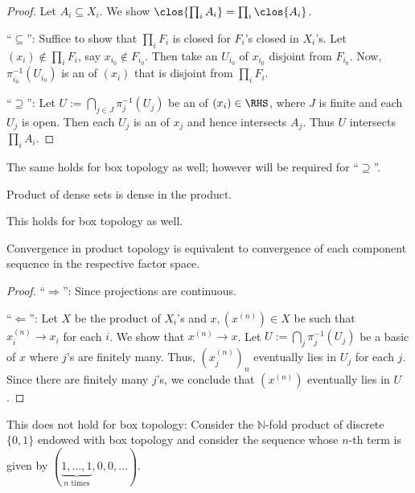 	\begin{proof}
		Let $A_i\subseteq X_i$. We show $\clos{\prod_i A_i} = \prod_i\clos{A_i}$.
		
		``$\subseteq$'': Suffice to show that $\prod_i F_i$ is closed for $F_i$'s closed in $X_i$'s. Let $(x_i)\notin\prod_i F_i$, say $x_{i_0}\notin F_{i_0}$. Then take an \onbd $U_{i_0}$ of $x_{i_0}$ disjoint from $F_{i_0}$. Now, $\pi_{i_0}^{-1}(U_{i_0})$ is an \onbd of $(x_i)$ that is disjoint from $\prod_i F_i$.
		
		``$\supseteq$'': Let $U := \bigcap_{j\in J}\pi_j^{-1}(U_j)$ be an \onbd of $(x_i)\in\RHS$, where $J$ is finite and each $U_j$ is open. Then each $U_j$ is an \onbd of $x_j$ and hence intersects $A_j$. Thus $U$ intersects $\prod_i A_i$.
	\end{proof}
	
	\begin{rmk}
		The same holds for box topology as well; however \AC will be required for ``$\supseteq$''.
	\end{rmk}
	
	\begin{cor}
		Product of dense sets is dense in the product.
	\end{cor}
	
	\begin{rmk}
		This holds for box topology as well.
	\end{rmk}
	
	
	\begin{prp}[Convergence]\label{PRP: convergence in prod topo}
		Convergence in product topology is equivalent to convergence of each component sequence in the respective factor space.
	\end{prp}
	
	\begin{proof}
		``$\Rightarrow$'': Since projections are continuous.
		
		``$\Leftarrow$'': Let $X$ be the product of $X_i$'s and $x, (x^{(n)})\in X$ be such that $x^{(n)}_i\to x_i$ for each $i$. We show that $x^{(n)}\to x$. Let $U := \bigcap_j \pi_j^{-1}(U_j)$ be a basic \onbd of $x$ where $j$'s are finitely many. Thus, $(x^{(n)}_j)_n$ eventually lies in $U_j$ for each $j$. Since there are finitely many $j$'s, we conclude that $(x^{(n)})$ eventually lies in $U$.
	\end{proof}
	
	\begin{rmk}
		This does not hold for box topology: Consider the $\mathbb N$-fold product of discrete $\{0, 1\}$ endowed with box topology and consider the sequence whose $n$-th term is given by $(\underbrace{1, \ldots, 1}_\text{$n$ times}, 0, 0, \ldots)$.
	\end{rmk}
	
